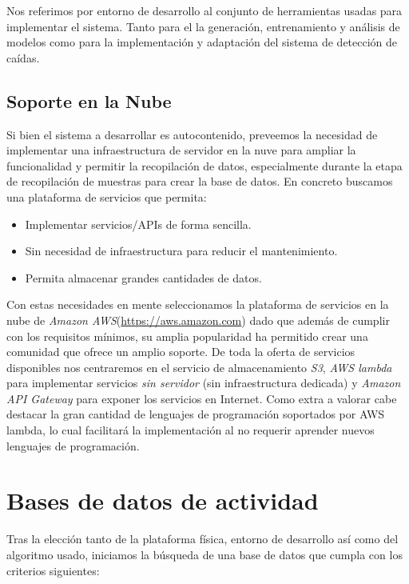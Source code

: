 Nos referimos por entorno de desarrollo al conjunto de herramientas usadas para implementar el sistema. Tanto para el la generación, entrenamiento y análisis de modelos como para la implementación y adaptación del sistema de detección de caídas.



\subsection{Soporte en la Nube}

Si bien el sistema a desarrollar es autocontenido, preveemos la necesidad de implementar una infraestructura de servidor en la nuve para ampliar la funcionalidad y permitir la recopilación de datos, especialmente durante la etapa de recopilación de muestras para crear la base de datos. En concreto buscamos una plataforma de servicios que permita:

\begin{itemize}
  \item Implementar servicios/APIs de forma sencilla.
  \item Sin necesidad de infraestructura para reducir el mantenimiento.
  \item Permita almacenar grandes cantidades de datos.
\end{itemize}

Con estas necesidades en mente seleccionamos la plataforma de servicios en la nube de \textit{Amazon AWS}(\url{https://aws.amazon.com}) dado que además de cumplir con los requisitos mínimos, su amplia popularidad ha permitido crear una comunidad que ofrece un amplio soporte. De toda la oferta de servicios disponibles nos centraremos en el servicio de almacenamiento \textit{S3}, \textit{AWS lambda} para implementar servicios \textit{sin servidor} (sin infraestructura dedicada) y \textit{Amazon API Gateway} para exponer los servicios en Internet. Como extra a valorar cabe destacar la gran cantidad de lenguajes de programación soportados por AWS lambda, lo cual facilitará la implementación al no requerir aprender nuevos lenguajes de programación.

\section{Bases de datos de actividad}\label{sec:req:bases_datos}

Tras la elección tanto de la plataforma física, entorno de desarrollo así como del algoritmo usado, iniciamos la búsqueda de una base de datos que cumpla con los criterios siguientes:

